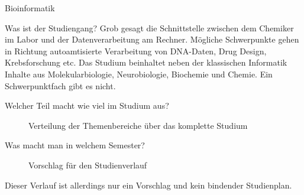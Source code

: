 	\begin{LARGE}
				Bioinformatik
			\end{LARGE}
			\begin{exampleblock}{Was ist der Studiengang?}
				Grob gesagt die Schnittstelle zwischen dem Chemiker im Labor und der Datenverarbeitung am Rechner. Mögliche Schwerpunkte gehen in Richtung autoamtisierte Verarbeitung von DNA-Daten, Drug Design, Krebsforschung etc.
				Das Studium beinhaltet neben der klassischen Informatik Inhalte aus Molekularbiologie, Neurobiologie, Biochemie und Chemie. Ein Schwerpunktfach gibt es nicht.
			\end{exampleblock}
		
			\begin{block}{Welcher Teil macht wie viel im Studium aus?}
				\begin{figure}[h!]
					\caption{Verteilung der Themenbereiche über das komplette Studium}
				\end{figure}
			\end{block}
		
		\begin{block}{Was macht man in welchem Semester?}
			\begin{figure}[h!]
				\caption{Vorschlag für den Studienverlauf}
			\end{figure}
		Dieser Verlauf ist allerdings nur ein Vorschlag und kein bindender Studienplan.
		\end{block}
